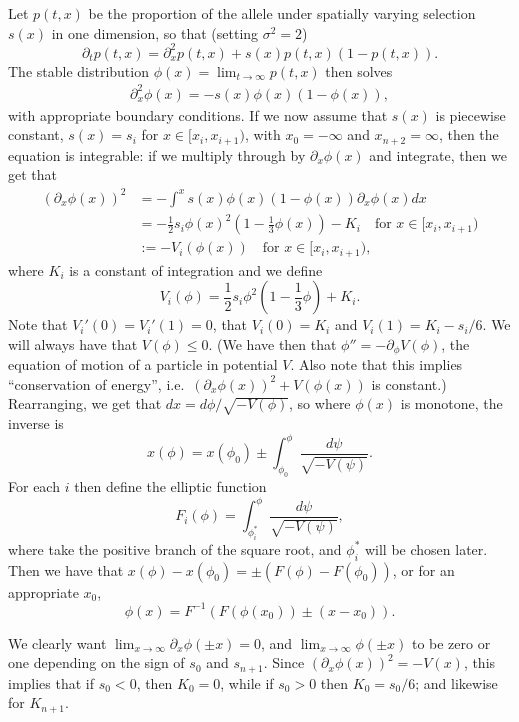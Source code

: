 \documentclass{article}
\begin{document}
Let $p(t,x)$ be the proportion of the allele under spatially varying selection $s(x)$ in one dimension,
so that (setting $\sigma^2=2$)
\[
    \partial_t p(t,x) = \partial_x^2 p(t,x) + s(x) p(t,x) (1-p(t,x)) .
\]
The stable distribution $\phi(x) = \lim_{t\to\infty} p(t,x)$ then solves
\begin{align} \label{eqn:definingphi}
    \partial_x^2 \phi(x) = - s(x) \phi(x) (1-\phi(x)) ,
\end{align}
with appropriate boundary conditions.
If we now assume that $s(x)$ is piecewise constant,
$s(x) = s_i$ for $x \in [x_i,x_{i+1})$, with $x_0=-\infty$ and $x_{n+2}=\infty$,
then the equation is integrable: if we multiply through by $\partial_x \phi(x)$ and integrate, then we get that
\begin{align} \label{eqn:conservation}
    ( \partial_x \phi(x) )^2  &= - \int^{x} s(x) \phi(x) (1-\phi(x)) \partial_x \phi(x) dx \\
        &= - \frac{1}{2} s_i \phi(x)^2 \left( 1 - \frac{1}{3} \phi(x) \right) - K_i \quad \mbox{for } x \in [x_i,x_{i+1}) \\
        &:= - V_i(\phi(x)) \quad \mbox{for } x \in [x_i,x_{i+1}) ,
\end{align}
where $K_i$ is a constant of integration and we define
\[
        V_i(\phi) = \frac{1}{2} s_i \phi^2 \left( 1 - \frac{1}{3} \phi \right) + K_i .
\]
Note that $V_i'(0)=V_i'(1)=0$, that $V_i(0)=K_i$ and $V_i(1) = K_i-s_i/6$.  
We will always have that $V(\phi) \le 0$.
(We have then that $\phi'' = - \partial_\phi V(\phi)$, the equation of motion of a particle in potential $V$.
Also note that this implies ``conservation of energy'', i.e.\ $( \partial_x \phi(x) )^2 + V(\phi(x))$ is constant.)
Rearranging, we get that $dx = d\phi / \sqrt{-V(\phi)}$, so where $\phi(x)$ is monotone, the inverse is
\[
    x(\phi) = x(\phi_0) \pm \int_{\phi_0}^\phi \frac{ d\psi }{ \sqrt{ -V(\psi) } } .
\]
For each $i$ then define the elliptic function
\[
    F_i(\phi) = \int_{\phi_i^*}^\phi \frac{ d\psi }{ \sqrt{ -V(\psi) } } ,
\]
where take the positive branch of the square root, and $\phi_i^*$ will be chosen later.
Then we have that
$x(\phi) - x(\phi_0) = \pm( F(\phi) - F(\phi_0))$,
or for an appropriate $x_0$,
\[
    \phi(x) = F^{-1}\left( F(\phi(x_0)) \pm (x - x_0) \right).
\]

We clearly want $\lim_{x \to \infty} \partial_x \phi(\pm x) = 0$, 
and $\lim_{x \to \infty} \phi(\pm x)$ to be zero or one depending on the sign of $s_0$ and $s_{n+1}$.
Since $(\partial_x \phi(x))^2 = -V(x)$, this implies that if $s_0<0$, then $K_0 = 0$,
while if $s_0>0$ then $K_0 = s_0/6$; and likewise for $K_{n+1}$.
\end{document}
